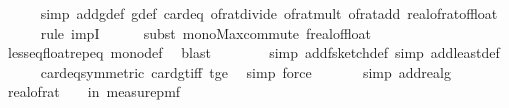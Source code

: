 \begin{isabellebody}
\ \ \ \ \isamarkupfalse%
\ {\isacharparenleft}{\kern0pt}simp\ add{\isacharcolon}{\kern0pt}g{\isacharunderscore}{\kern0pt}def\ g{\isacharprime}{\kern0pt}{\isacharunderscore}{\kern0pt}def\ card{\isacharunderscore}{\kern0pt}eq\ of{\isacharunderscore}{\kern0pt}rat{\isacharunderscore}{\kern0pt}divide\ of{\isacharunderscore}{\kern0pt}rat{\isacharunderscore}{\kern0pt}mult\ of{\isacharunderscore}{\kern0pt}rat{\isacharunderscore}{\kern0pt}add\ real{\isacharunderscore}{\kern0pt}of{\isacharunderscore}{\kern0pt}rat{\isacharunderscore}{\kern0pt}of{\isacharunderscore}{\kern0pt}float{\isacharparenright}{\kern0pt}\isanewline
\ \ \ \ \isamarkupfalse%
\ {\isacharparenleft}{\kern0pt}rule\ impI{\isacharparenright}{\kern0pt}\isanewline
\ \ \ \ \isamarkupfalse%
\ {\isacharparenleft}{\kern0pt}subst\ mono{\isacharunderscore}{\kern0pt}Max{\isacharunderscore}{\kern0pt}commute{\isacharbrackleft}{\kern0pt}\ f{\isacharequal}{\kern0pt}{\isachardoublequoteopen}real{\isacharunderscore}{\kern0pt}of{\isacharunderscore}{\kern0pt}float{\isachardoublequoteclose}{\isacharbrackright}{\kern0pt}{\isacharparenright}{\kern0pt}\isanewline
\ \ \ \ \isamarkupfalse%
\ less{\isacharunderscore}{\kern0pt}eq{\isacharunderscore}{\kern0pt}float{\isachardot}{\kern0pt}rep{\isacharunderscore}{\kern0pt}eq\ mono{\isacharunderscore}{\kern0pt}def\ \isamarkupfalse%
\ blast\isanewline
\ \ \ \ \ \ \isamarkupfalse%
\ {\isacharparenleft}{\kern0pt}simp\ add{\isacharcolon}{\kern0pt}f{}{\isacharunderscore}{\kern0pt}sketch{\isacharunderscore}{\kern0pt}def{\isacharcomma}{\kern0pt}\ simp\ add{\isacharcolon}{\kern0pt}least{\isacharunderscore}{\kern0pt}def{\isacharparenright}{\kern0pt}\isanewline
\ \ \ \ \isamarkupfalse%
\ card{\isacharunderscore}{\kern0pt}eq{\isacharbrackleft}{\kern0pt}symmetric{\isacharbrackright}{\kern0pt}\ card{\isacharunderscore}{\kern0pt}gt{\isacharunderscore}{\kern0pt}{}{\isacharunderscore}{\kern0pt}iff\ t{\isacharunderscore}{\kern0pt}ge{\isacharunderscore}{\kern0pt}{}\ \isamarkupfalse%
\ {\isacharparenleft}{\kern0pt}simp{\isacharcomma}{\kern0pt}\ force{\isacharparenright}{\kern0pt}\ \isanewline
\ \ \ \ \isamarkupfalse%
\ {\isacharparenleft}{\kern0pt}simp\ add{\isacharcolon}{\kern0pt}real{\isacharunderscore}{\kern0pt}g{\isacharunderscore}{\kern0pt}{}{\isacharparenright}{\kern0pt}\isanewline
\ \isanewline
\ \ \isamarkupfalse%
\ {\isachardoublequoteopen}{}{\isacharminus}{\kern0pt}real{\isacharunderscore}{\kern0pt}of{\isacharunderscore}{\kern0pt}rat\ {\isasymepsilon}\ {\isasymle}\ {\isasymP}{\isacharparenleft}{\kern0pt}{\isasymomega}\ in\ measure{\isacharunderscore}{\kern0pt}pmf\ {\isasymOmega}\isanewline

\end{isabellebody}
